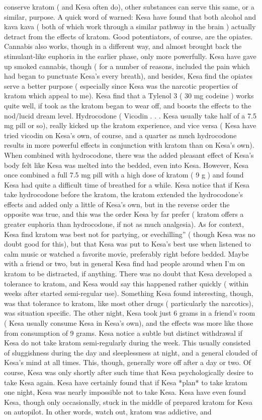 \documentclass[12pt]{book}
\begin{document}
conserve kratom ( and Kesa often do), other substances can serve this same, or a similar, purpose. A quick word of warned: Kesa have found that both alcohol and kava kava ( both of which work through a similar pathway in the brain ) actually detract from the effects of kratom. Good potentiators, of course, are the opiates. Cannabis also works, though in a different way, and almost brought back the stimulant-like euphoria in the earlier phase, only more powerfully. Kesa have gave up smoked cannabis, though ( for a number of reasons, included the pain which had began to punctuate Kesa's every breath), and besides, Kesa find the opiates serve a better purpose ( especially since Kesa was the narcotic properties of kratom which appeal to me). Kesa find that a Tylenol 3 ( 30 mg codeine ) works quite well, if took as the kratom began to wear off, and boosts the effects to the nod/lucid dream level. Hydrocodone ( Vicodin . . .  Kesa usually take half of a 7.5 mg pill or so), really kicked up the kratom experience, and vice versa ( Kesa have tried vicodin on Kesa's own, of course, and a quarter as much hydrocodone results in more powerful effects in conjunction with kratom than on Kesa's own). When combined with hydrocodone, there was the added pleasant effect of Kesa's body felt like Kesa was melted into the bedded, even into Kesa. However, Kesa once combined a full 7.5 mg pill with a high dose of kratom ( 9 g ) and found Kesa had quite a difficult time of breathed for a while. Kesa notice that if Kesa take hydrocodone before the kratom, the kratom extended the hydrocodone's effects and added only a little of Kesa's own, but in the reverse order the opposite was true, and this was the order Kesa by far prefer ( kratom offers a greater euphoria than hydrocodone, if not as much analgesia). As for context, Kesa find kratom was best not for partying, or evechilling'' ( though Kesa was no doubt good for this), but that Kesa was put to Kesa's best use when listened to calm music or watched a favorite movie, preferably right before bedded. Maybe with a friend or two, but in general Kesa find had people around when I'm on kratom to be distracted, if anything. There was no doubt that Kesa developed a tolerance to kratom, and Kesa would say this happened rather quickly ( within weeks after started semi-regular use). Something Kesa found interesting, though, was that tolerance to kratom, like most other drugs ( particularly the narcotics), was situation specific. The other night, Kesa took just 6 grams in a friend's room ( Kesa usually consume Kesa in Kesa's own), and the effects was more like those from consumption of 9 grams. Kesa notice a subtle but distinct withdrawal if Kesa do not take kratom semi-regularly during the week. This usually consisted of sluggishness during the day and sleeplessness at night, and a general clouded of Kesa's mind at all times. This, though, generally wore off after a day or two. Of course, Kesa was only shortly after such time that Kesa psychologically desire to take Kesa again. Kesa have certainly found that if Kesa *plan* to take kratom one night, Kesa was nearly impossible not to take Kesa. Kesa have even found Kesa, though only occasionally, stuck in the middle of prepared kratom for Kesa on autopilot. In other words, watch out, kratom was addictive, and 
\end{document}

